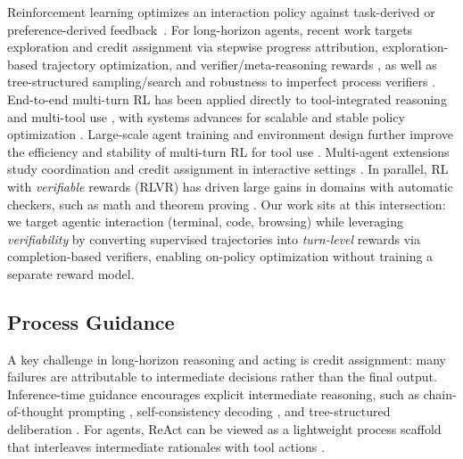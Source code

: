 Reinforcement learning optimizes an interaction policy against task-derived or preference-derived feedback~\citep{ouyang2022training,schulman2017ppo,schulman2015trpo}.
For long-horizon agents, recent work targets exploration and credit assignment via stepwise progress attribution, exploration-based trajectory optimization, and verifier/meta-reasoning rewards \citep{wang2025sparl,song2024trialerror,zhang2025rlvmr}, as well as tree-structured sampling/search and robustness to imperfect process verifiers \citep{ji2025treesearchllmrl,rohatgi2025tamingprocessverifiers}.
End-to-end multi-turn RL has been applied directly to tool-integrated reasoning and multi-tool use \citep{xue2025simpletir,dong2025toolstar}, with systems advances for scalable and stable policy optimization \citep{yang2025dcpo,yu2025dapo}.
Large-scale agent training and environment design further improve the efficiency and stability of multi-turn RL for tool use \citep{luo2025agentlightningtrainai,dong2025agenticreinforcedpolicyoptimization}.
Multi-agent extensions study coordination and credit assignment in interactive settings \citep{zhou2025sweetrl,xi2025agentgymrl}.
In parallel, RL with \emph{verifiable} rewards (RLVR) has driven large gains in domains with automatic checkers, such as math and theorem proving \citep{shao2024deepseekmath,xin2024deepseekproverv15harnessingproofassistant,Guo_2025}.
Our work sits at this intersection: we target agentic interaction (terminal, code, browsing) while leveraging \emph{verifiability} by converting supervised trajectories into \emph{turn-level} rewards via completion-based verifiers, enabling on-policy optimization without training a separate reward model.

\subsection{Process Guidance}

A key challenge in long-horizon reasoning and acting is credit assignment: many failures are attributable to intermediate decisions rather than the final output.
Inference-time guidance encourages explicit intermediate reasoning, such as chain-of-thought prompting \citep{wei2022cot}, self-consistency decoding \citep{wang2022selfconsistency}, and tree-structured deliberation \citep{yao2023treeofthoughts}.
For agents, ReAct can be viewed as a lightweight process scaffold that interleaves intermediate rationales with tool actions \citep{yao2023react}.

